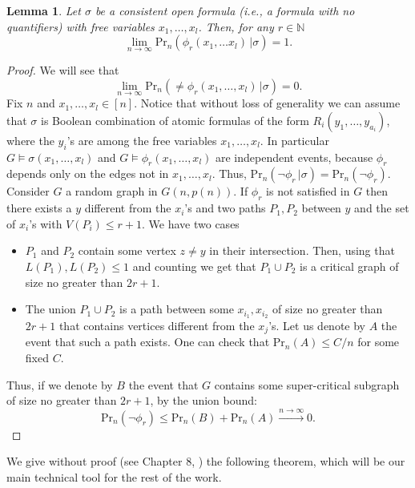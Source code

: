 \documentclass[11pt,notitlepage,a4paper]{article}
\newtheorem{lemma}{Lemma}[section]
\theoremstyle{definition}
\newcommand{\N}{\mathbb{N}}
\newcommand{\Ln}{\lim\limits_{n\to \infty}}
\begin{document}
\begin{lemma} \label{lem:faraway}
	Let $\sigma$ be a consistent open formula (i.e., a formula with no quantifiers)
	with free variables $x_1, \dots, x_l$. Then, for any $r\in \N$
	\[ \Ln \mathrm{Pr}_n(\phi_r(x_1, \dots x_l) \, | \sigma ) =1 .\]
\end{lemma}
\begin{proof}
	We will see that
	\[ \Ln \mathrm{Pr}_n(\neq \phi_r(x_1, \dots, x_l) \, | \sigma ) =0.\]
	Fix $n$ and $x_1,\dots, x_l \in [n]$.
    Notice that without loss of generality we can
	assume that $\sigma$ is Boolean combination of atomic
	formulas of the form $R_i(y_1,\dots,y_{a_i})$, where the $y_i$'s
	are among the free variables $x_1,\dots, x_l$.
	In particular $G\models \sigma(x_1, \dots, x_l)$ and 
	$G\models \phi_r(x_1,\dots, x_l)$
	are independent events, because $\phi_r$ depends
	only on the edges not in $x_1,\dots, x_l$.
	Thus, $\mathrm{Pr}_n(\neg \phi_r \, | \sigma)= \mathrm{Pr}_n(\neg \phi_r)$.
	Consider $G$ a random graph in $G(n,p(n))$. 
	If $\phi_r$ is not satisfied in $G$ then 
	there exists a $y$ different from the $x_i$'s
	and two paths $P_1,P_2$ between $y$ and the set 
	of $x_i$'s with $V(P_i)\leq r+1$. We have two cases
	\begin{itemize}[leftmargin=*]
		\item $P_1$ and $P_2$ contain some vertex $z\neq y$
		in their intersection. Then, using that
		$L(P_1), L(P_2)\leq 1$ and counting we get that
		$P_1\cup P_2$ is a critical graph of size no greater
		than $2r+1$.
		\item The union $P_1\cup P_2$ is a path
		between some $x_{i_1}, x_{i_2}$ of size no greater
		than $2r+1$ that contains vertices different
		from the $x_j$'s. Let us denote by $A$ the event that
		such a path exists. One can check that $\mathrm{Pr}_n(A)\leq C/n$
		for some fixed $C$.   	
	\end{itemize}
	Thus, if we denote by $B$ the event that $G$ contains some 
	super-critical subgraph of size no greater than $2r+1$,  by the
	union bound:
	\[ \mathrm{Pr}_n(\neg \phi_r)\leq  \mathrm{Pr}_n(B)+ \mathrm{Pr}_n(A) 
	\stackrel{n\to \infty}{\longrightarrow}	0.\]
\end{proof}

We give without proof (see Chapter 8, \cite{lecturenotes}) the following theorem,
which will be our main technical tool for the rest of the work. 
\end{document}
